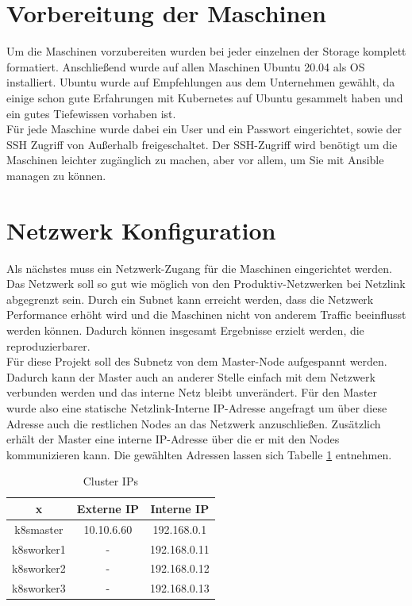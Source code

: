 \section{Vorbereitung der Maschinen}
Um die Maschinen vorzubereiten wurden bei jeder einzelnen der Storage komplett formatiert.
Anschließend wurde auf allen Maschinen Ubuntu 20.04 als \ac{OS} installiert.
Ubuntu wurde auf Empfehlungen aus dem Unternehmen gewählt, da einige schon gute Erfahrungen mit Kubernetes auf Ubuntu gesammelt haben und ein gutes Tiefewissen vorhaben ist.
\\
Für jede Maschine wurde dabei ein User und ein Passwort eingerichtet, sowie der \ac{SSH} Zugriff von Außerhalb freigeschaltet.
Der SSH-Zugriff wird benötigt um die Maschinen leichter zugänglich zu machen, aber vor allem, um Sie mit Ansible managen zu können.


\section{Netzwerk Konfiguration}
Als nächstes muss ein Netzwerk-Zugang für die Maschinen eingerichtet werden.
Das Netzwerk soll so gut wie möglich von den Produktiv-Netzwerken bei Netzlink abgegrenzt sein.
Durch ein Subnet kann erreicht werden, dass die Netzwerk Performance erhöht wird und die Maschinen nicht von anderem Traffic beeinflusst werden können.
Dadurch können insgesamt Ergebnisse erzielt werden, die reproduzierbarer. 
\\
Für diese Projekt soll des Subnetz von dem Master-Node aufgespannt werden. 
Dadurch kann der Master auch an anderer Stelle einfach mit dem Netzwerk verbunden werden und das interne Netz bleibt unverändert.
Für den Master wurde also eine statische Netzlink-Interne \ac{IP}-Adresse angefragt um über diese Adresse auch die restlichen Nodes an das Netzwerk anzuschließen.
Zusätzlich erhält der Master eine interne \ac{IP}-Adresse über die er mit den Nodes kommunizieren kann.
Die gewählten Adressen lassen sich Tabelle \ref{table:katanetes_ips} entnehmen.

\begin{table}
    \centering
    \begin{tabular}[h!]{ c | c c }
        x & Externe \ac{IP} & Interne \ac{IP} \\
        \hline
        k8smaster & 10.10.6.60 & 192.168.0.1 \\
        k8sworker1 & - & 192.168.0.11 \\
        k8sworker2 & - & 192.168.0.12 \\
        k8sworker3 & - & 192.168.0.13 \\
    \end{tabular}
    \caption{Cluster IPs}
    \label{table:katanetes_ips}
\end{table}

